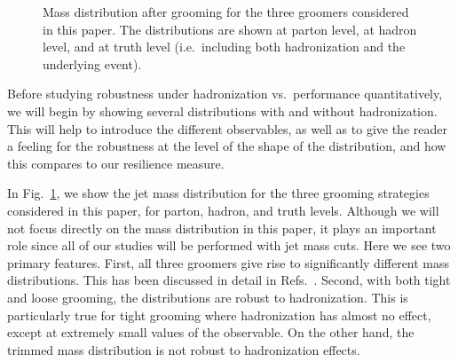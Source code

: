 \documentclass[11pt]{cernrep}
\begin{document}
\begin{figure}
  \caption{Mass distribution after grooming for the three groomers
    considered in this paper. The distributions are shown at parton
    level, at hadron level, and at truth level (i.e.\ including both
    hadronization and the underlying event).}\label{jetsub_2prong_fig:mass-distribution}
\end{figure}

Before studying robustness under hadronization vs.\ performance quantitatively, we will begin by showing several distributions with and without hadronization.
%
This will help to introduce the different observables, as well as to give the reader a feeling for the robustness at the level of the shape of the distribution, and how this compares to our resilience measure. 

In Fig.~\ref{jetsub_2prong_fig:mass-distribution}, we show the jet mass distribution for the three grooming strategies considered in this paper, for parton, hadron, and truth levels.
%
Although we will not focus directly on the mass distribution in this paper, it plays an important role since all of our studies will be performed with jet mass cuts.
%
Here we see two primary features.
%
First, all three groomers give rise to significantly different mass distributions.
%
This has been discussed in detail in Refs.~\cite{Dasgupta:2013ihk,Larkoski:2014wba}.
%
Second, with both tight and loose grooming, the distributions are robust to hadronization.
%
This is particularly true for tight grooming where hadronization has almost no effect, except at extremely small values of the observable.
%
On the other hand, the trimmed mass distribution is not robust to hadronization effects. 
\end{document}
